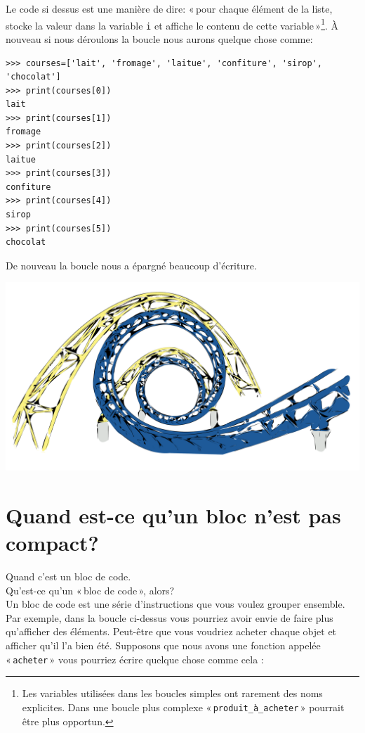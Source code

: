 Le code si dessus est une manière de dire: « pour chaque élément de la liste, stocke la valeur dans la variable \texttt{i} et affiche le contenu de cette variable »\footnote{Les variables utilisées dans les boucles simples ont rarement des noms explicites. Dans une boucle plus complexe « \texttt{produit\_à\_acheter} » pourrait être plus opportun.}.  À nouveau si nous déroulons la boucle nous aurons quelque chose comme:

\begin{small}
\begin{Verbatim}[frame=single,rulecolor=\color{gray}, label=ne pas saisir]
>>> courses=['lait', 'fromage', 'laitue', 'confiture', 'sirop', 'chocolat']
>>> print(courses[0])
lait
>>> print(courses[1])
fromage
>>> print(courses[2])
laitue
>>> print(courses[3])
confiture
>>> print(courses[4])
sirop
>>> print(courses[5])
chocolat
\end{Verbatim}
\end{small}

De nouveau la boucle nous a épargné beaucoup d'écriture.

\begin{center}
\includegraphics[scale=.2]{images/SteveLambert_Roller_Coaster_Tracks.pdf} 
\end{center}


\section{Quand est-ce qu'un bloc n'est pas compact?}
Quand c'est un bloc de code.\\

Qu'est-ce qu'un « bloc de code », alors?\\

Un bloc de code est une série d'instructions que vous voulez grouper ensemble.
Par exemple, dans la boucle ci-dessus vous pourriez avoir envie de faire plus qu'afficher des éléments. 
Peut-être que vous voudriez acheter chaque objet et afficher qu'il l'a bien été.
Supposons que nous avons une fonction appelée « \texttt{acheter} » vous pourriez écrire quelque chose comme cela :

